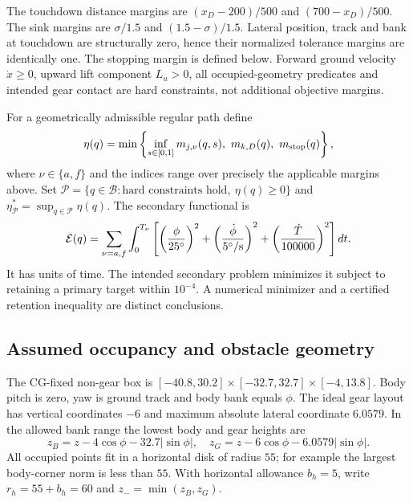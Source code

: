 The touchdown distance margins are $(x_D-200)/500$ and $(700-x_D)/500$. The sink margins are $\sigma/1.5$ and $(1.5-\sigma)/1.5$. Lateral position, track and bank at touchdown are structurally zero, hence their normalized tolerance margins are identically one. The stopping margin is defined below. Forward ground velocity $\dot x\geq0$, upward lift component $L_u>0$, all occupied-geometry predicates and intended gear contact are hard constraints, not additional objective margins.

For a geometrically admissible regular path define
\begin{equation}\label{eq:objective}
 \eta(q)=\min\left\{\inf_{s\in[0,1]}m_{j,\nu}(q,s),\ m_{k,D}(q),\ m_{\rm stop}(q)\right\},
\end{equation}
where $\nu\in\{a,f\}$ and the indices range over precisely the applicable margins above. Set $\mathcal P=\{q\in\mathcal B:\text{hard constraints hold},\ \eta(q)\geq0\}$ and $\eta^*_{\mathcal P}=\sup_{q\in\mathcal P}\eta(q)$. The secondary functional is
\begin{equation}\label{eq:effort}
 \mathcal E(q)=\sum_{\nu=a,f}\int_0^{T_\nu}
 \left[\left(\frac{\phi}{25^\circ}\right)^2+
 \left(\frac{\dot\phi}{5^\circ/{\rm s}}\right)^2+
 \left(\frac{\dot T}{100000}\right)^2\right]dt.
\end{equation}
It has units of time. The intended secondary problem minimizes it subject to retaining a primary target within $10^{-4}$. A numerical minimizer and a certified retention inequality are distinct conclusions.

\subsection{Assumed occupancy and obstacle geometry}\label{sec:geometry}
The CG-fixed non-gear box is $[-40.8,30.2]\times[-32.7,32.7]\times[-4,13.8]$. Body pitch is zero, yaw is ground track and body bank equals $\phi$. The ideal gear layout has vertical coordinates $-6$ and maximum absolute lateral coordinate $6.0579$. In the allowed bank range the lowest body and gear heights are
\begin{equation}\label{eq:support}
 z_B=z-4\cos\phi-32.7|\sin\phi|,\quad
 z_G=z-6\cos\phi-6.0579|\sin\phi|.
\end{equation}
All occupied points fit in a horizontal disk of radius $55$; for example the largest body-corner norm is less than $55$. With horizontal allowance $b_h=5$, write $r_h=55+b_h=60$ and $z_-=\min(z_B,z_G)$.

